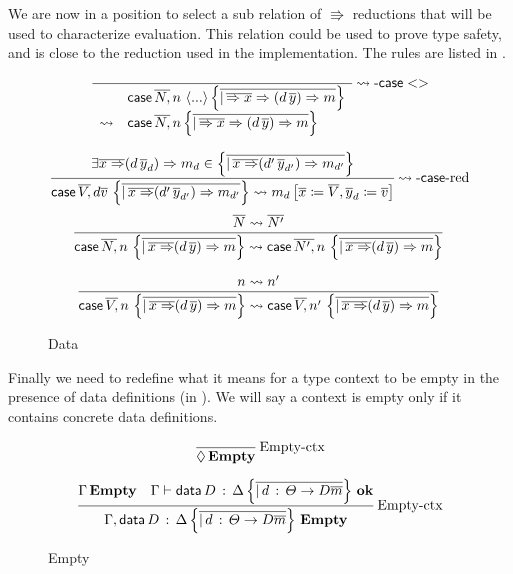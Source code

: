 We are now in a position to select a sub relation of $\Rrightarrow$ reductions that will be used to characterize \cbv{} evaluation.
This relation could be used to prove type safety, and is close to the reduction used in the implementation.
The rules are listed in .

\begin{figure}
\[
\frac{\,}{
  \begin{array}{rl}
   & \mathsf{case}{} \,\overline{N,}\,n\,\left\langle ...\right\rangle \left\{ \overline{|\,\overline{\Rightarrow x}\Rightarrow(d\,\overline{y})\Rightarrow m}\right\} \\
   \rightsquigarrow & \mathsf{case}{} \,\overline{N,}\,n\left\{ \overline{|\,\overline{\Rightarrow x}\Rightarrow(d\,\overline{y})\Rightarrow m}\right\} 
  \end{array}
   }\operatorname{\rightsquigarrow-\mathsf{case}{}<>}
\]

\[
\frac{\exists\overline{x\Rightarrow}(d\,\overline{y}_{d})\Rightarrow m_{d}\in\left\{ \overline{|\,\overline{x\Rightarrow}(d'\,\overline{y}_{d'})\Rightarrow m_{d'}}\right\} }{\mathsf{case}{} \,\overline{V,}\,d\overline{v}\,\left\{ \overline{|\,\overline{x\Rightarrow}(d'\,\overline{y}_{d'})\Rightarrow m_{d'}}\right\} \rightsquigarrow m_{d}\left[\overline{x}\coloneqq\overline{V},\overline{y}_{d}\coloneqq\overline{v}\right]
}\operatorname{\rightsquigarrow-\mathsf{case}{}-red}
\]
\[
\frac{\overline{N}\rightsquigarrow\overline{N'}}{\mathsf{case}{} \,\overline{N,}\,n\,\left\{ \overline{|\,\overline{x\Rightarrow}(d\,\overline{y})\Rightarrow m}\right\} \rightsquigarrow \mathsf{case}{} \,\overline{N',}\,n\,\left\{ \overline{|\,\overline{x\Rightarrow}(d\,\overline{y})\Rightarrow m}\right\} }\,
\]

\[
\frac{n\rightsquigarrow n'}{\mathsf{case}{} \,\overline{V,}\,n\,\left\{ \overline{|\,\overline{x\Rightarrow}(d\,\overline{y})\Rightarrow m}\right\} \rightsquigarrow \mathsf{case}{} \,\overline{V,}\,n'\,\left\{ \overline{|\,\overline{x\Rightarrow}(d\,\overline{y})\Rightarrow m}\right\} }\,
\]

\caption{\SLang{} Data \CbV{}}
\label{fig:surface-data-cbv}
\end{figure}

Finally we need to redefine what it means for a type context to be empty in the presence of data definitions (in ).
We will say a context is empty only if it contains concrete data definitions.

\begin{figure}
\[
\frac{\ }{\lozenge\,\mathbf{Empty}}\rulename{Empty-ctx}
\]

\[
\frac{\Gamma\,\mathbf{Empty}\quad\Gamma\vdash\mathsf{data}\,D\,:\,\Delta\left\{ \overline{|\,d\,:\,\varTheta\rightarrow D\overline{m}}\right\} \,\mathbf{ok}}{\Gamma,\mathsf{data}\,D\,:\,\Delta\left\{ \overline{|\,d\,:\,\varTheta\rightarrow D\overline{m}}\right\} \,\mathbf{Empty}}\operatorname{Empty-ctx}
\]

\caption{\SLang{} Empty}
\label{fig:surface-data-empty}
\end{figure}


